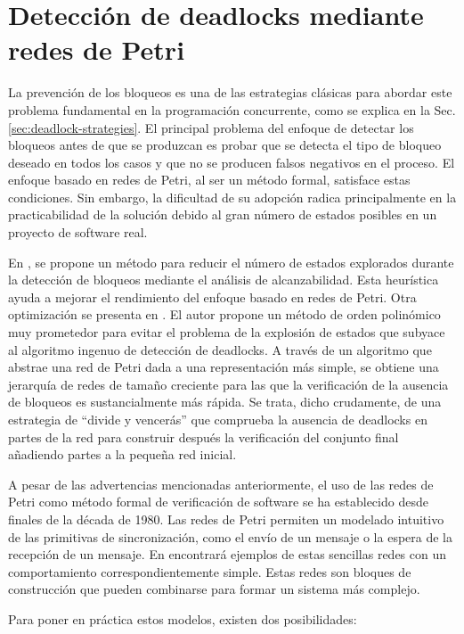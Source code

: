 \section{Detección de deadlocks mediante redes de Petri}

La prevención de los bloqueos es una de las estrategias clásicas para abordar este problema
fundamental en la programación concurrente, como se explica en la Sec. \ref{sec:deadlock-strategies}.
El principal problema del enfoque de detectar los bloqueos antes de que se produzcan es probar que se
detecta el tipo de bloqueo deseado en todos los casos y que no se producen falsos negativos en
el proceso. El enfoque basado en redes de Petri, al ser un método formal, satisface estas
condiciones. Sin embargo, la dificultad de su adopción radica principalmente en la
practicabilidad de la solución debido al gran número de estados posibles en un proyecto de
software real.

En \cite{karatkevich2014deadlock}, se propone un método para reducir el número de estados
explorados durante la detección de bloqueos mediante el análisis de alcanzabilidad. Esta
heurística ayuda a mejorar el rendimiento del enfoque basado en redes de Petri. Otra
optimización se presenta en \cite{kungas2005petri}. El autor propone un método de orden polinómico
muy prometedor para evitar el problema de la explosión de estados que subyace al algoritmo
ingenuo de detección de deadlocks.
A través de un algoritmo que abstrae una red de Petri dada a una representación más simple, se obtiene una
jerarquía de redes de tamaño creciente para las que la verificación de la ausencia de bloqueos es
sustancialmente más rápida. Se trata, dicho crudamente, de una estrategia de ``divide y
vencerás'' que comprueba la ausencia de deadlocks en partes de la red para construir después la
verificación del conjunto final añadiendo partes a la pequeña red inicial.

A pesar de las advertencias mencionadas anteriormente, el uso de las redes de Petri como
método formal de verificación de software se ha establecido desde finales de la década de
1980. Las redes de Petri permiten un modelado intuitivo de las primitivas de sincronización,
como el envío de un mensaje o la espera de la recepción de un mensaje.
En \cite{heiner1992petri} encontrará ejemplos de estas sencillas redes con un comportamiento correspondientemente
simple. Estas redes son bloques de construcción que pueden combinarse para formar un
sistema más complejo.

Para poner en práctica estos modelos, existen dos posibilidades:

